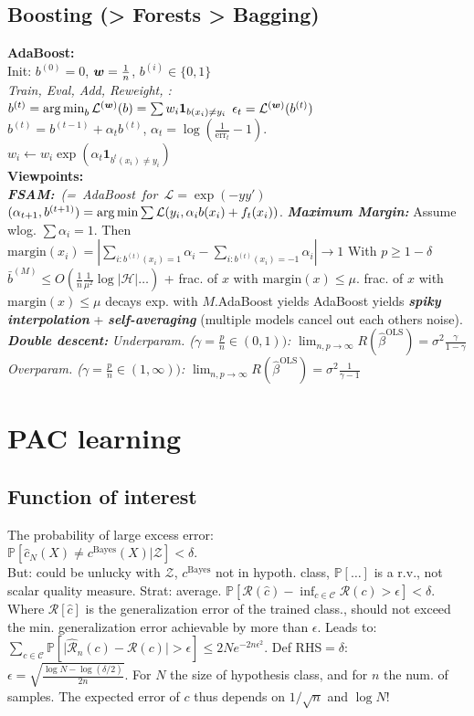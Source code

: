 \subsection*{Boosting (> Forests > Bagging)}
\textbf{AdaBoost:}\\
Init: $b^{(0)}=0$, ${\bm{w}}=\frac{1}{n}$, $b^{(i)}\in\{0,1\}$\\
\emph{Train, Eval, Add, Reweight, {\tiny\CircArrowRight{}}:}\\
$b^{(t)} = \operatorname*{arg\,min}_b \mathcal{L}^{({\bm{w}})}(b)=\sum w_i\mathbf{1}_{b(x_i)\neq y_i}$
$\epsilon_t=\mathcal{L}^{({\bm{w}})}(b^{(t)})$\\
$b^{(t)} = b^{(t-1)} + \alpha_t b^{(t)}$, $\alpha_t = \log(\frac{1}{\mathrm{err}_t}-1)$.\\
$w_i \leftarrow w_i\exp(\alpha_t\mathbf{1}_{b^{t}(x_i) \neq y_i})$\\
\textbf{Viewpoints:}\\
\mbox{\emph{\textbf{FSAM:}} \emph{(= AdaBoost for $\mathcal{L}=\exp(-yy')$}}
$(\alpha_{t+1}, b^{(t+1)}) = \operatorname*{arg\,min}\sum\mathcal{L}(y_i, \alpha_i b(x_i) + f_t(x_i))$.
\emph{\textbf{Maximum Margin:}} Assume wlog. $\sum \alpha_i = 1$. Then $\mathrm{margin}(x_i)=|\sum_{i:b^{(t)}(x_i)=1}\alpha_i - \sum_{i:b^{(t)}(x_i)=-1}\alpha_i| \to 1$
With $p\geq 1-\delta$ $\bar{b}^{(M)} \leq O(\frac{1}{n}\frac{1}{\mu^2}\log|\mathcal{H}|\ldots)$ + frac. of $x$ with $\mathrm{margin}(x) \leq \mu$. frac. of $x$ with $\mathrm{margin}(x) \leq \mu$ decays exp. with $M$.AdaBoost yields AdaBoost yields 
\emph{\textbf{spiky interpolation}} + \emph{\textbf{self-averaging}} (multiple models cancel out each others noise). \emph{\textbf{Double descent:}} \emph{Underparam. ($\gamma = \frac{p}{n}\in(0,1))$:} $\lim_{n,p\to\infty} R(\hat{\beta}^{\mathrm{OLS}}) = \sigma^2\frac{\gamma}{1-\gamma}$ \emph{Overparam. ($\gamma = \frac{p}{n}\in(1,\infty))$:} $\lim_{n,p\to\infty} R(\hat{\beta}^{\mathrm{OLS}}) = \sigma^2\frac{1}{\gamma-1}$ 

\section*{PAC learning}
\subsection*{Function of interest}
The probability of large excess error:\\
$\mathbb{P}[\hat{c}_N(X)\neq c^\text{Bayes}(X)|\mathcal{Z}]<\delta$.\\
But: could be unlucky with $\mathcal{Z}$, $c^\text{Bayes}$ not in hypoth. class, $\mathbb{P}[\dots]$ is a r.v., not scalar quality measure. Strat: average.
$\mathbb{P}[\mathcal{R}(\hat{c})-\inf_{c\in\mathcal{C}}\mathcal{R}(c)>\epsilon]<\delta$. Where $\mathcal{R}[\hat{c}]$ is the generalization error of the trained class., should not exceed the min. generalization error achievable by more than $\epsilon$.
Leads to:\\
$\sum_{c\in\mathcal{C}}\mathbb{P}[\lvert \hat{\mathcal{R}}_n(c)-\mathcal{R}(c)\rvert>\epsilon]\leq 2Ne^{-2n\epsilon^2}$. Def RHS$=\delta$: $\epsilon=\sqrt{\frac{\log N - \log(\delta/2)}{2n}}$. For $N$ the size of hypothesis class, and for $n$ the num. of samples. The expected error of $c$ thus depends on $1/\sqrt{n}$ and $\log N$!
